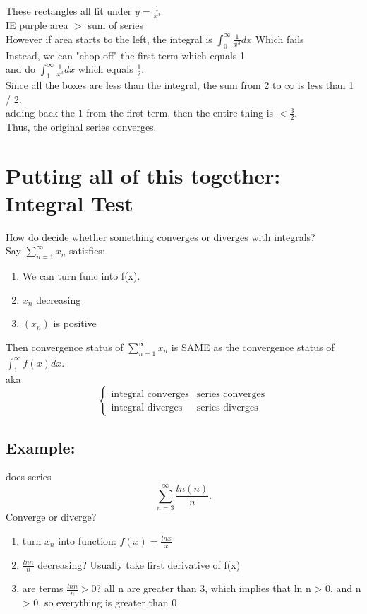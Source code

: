 \documentclass[12pt]{article}
\begin{document}
These rectangles all fit under $y = \frac{1}{x^{3}}$ 
\\
IE purple area $>$ sum of series 
\\
However if area starts to the left, the integral is $\int_{0}^{\infty} \frac{1}{x^{3}} dx $ Which fails 
\\
Instead, we can "chop off" the first term which equals 1 
\\
and do $\int_{1}^{\infty} \frac{1}{x^{3}} dx $ which equals $\frac{1}{2}$.
\\ 
Since all the boxes are less than the integral, the sum from 2 to $\infty$ is less than 1 / 2. 
\\
adding back the 1 from the first term, then the entire thing is $< \frac{3}{2}$. 
\\
Thus, the original series converges.
\section*{Putting all of this together: Integral Test}
How do decide whether something converges or diverges with integrals?\\

Say $\sum_{n=1}^{\infty} x_n $ satisfies:
\begin{enumerate}
        \item We can turn func into f(x). 
        \item $x_n$ decreasing 
        \item $(x_n)$ is positive  
\end{enumerate}
Then convergence status of $\sum_{n=1}^{\infty} x_n $ is SAME as the convergence status of $\int_{1}^{\infty} f(x) dx $. 
\\
aka
\\
\[ \begin{cases}
                \text{integral converges} & \text{series converges} \\
                \text{integral diverges}  & \text{series diverges} 
\end{cases}
\]

\subsection*{Example:}
does series \[
        \sum_{n=3}^{\infty} \frac{ln(n)}{n}
.\] Converge or diverge?

\begin{enumerate}
\item turn $x_n$ into function: 
        \subitem $f(x) = \frac{ln x}{x}$ 
        \item $\frac{ln n}{n}$ decreasing?
                \subitem Usually take first derivative of f(x)  
                \item are terms $\frac{ln n}{n} > 0$? 
                        \subitem all n are greater than 3, which implies that ln n > 0, and n > 0, so everything is greater than 0  
\end{enumerate}
\end{document}
